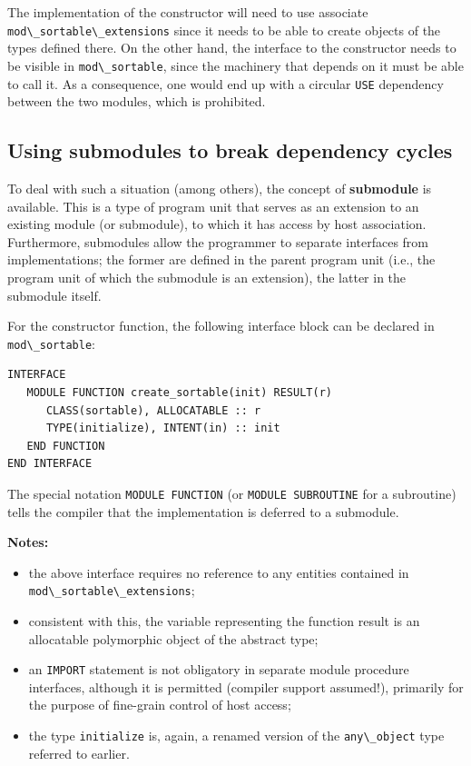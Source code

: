 \documentclass[
  paper=a4,
  ,captions=tableheading
]{scrartcl}
\newcommand{\passthrough}[1]{#1}
\providecommand{\tightlist}{%
  \setlength{\itemsep}{0pt}\setlength{\parskip}{0pt}}
\begin{document}
The implementation of the constructor will need to use associate
\passthrough{\lstinline!mod\_sortable\_extensions!} since it needs to be
able to create objects of the types defined there. On the other hand,
the interface to the constructor needs to be visible in
\passthrough{\lstinline!mod\_sortable!}, since the machinery that
depends on it must be able to call it. As a consequence, one would end
up with a circular \passthrough{\lstinline!USE!} dependency between the
two modules, which is prohibited.

\subsection{Using submodules to break dependency
cycles}\label{using-submodules-to-break-dependency-cycles}

To deal with such a situation (among others), the concept of
\textbf{submodule} is available. This is a type of program unit that
serves as an extension to an existing module (or submodule), to which it
has access by host association. Furthermore, submodules allow the
programmer to separate interfaces from implementations; the former are
defined in the parent program unit (i.e., the program unit of which the
submodule is an extension), the latter in the submodule itself.

For the constructor function, the following interface block can be
declared in \passthrough{\lstinline!mod\_sortable!}:

\begin{lstlisting}
INTERFACE
   MODULE FUNCTION create_sortable(init) RESULT(r)
      CLASS(sortable), ALLOCATABLE :: r
      TYPE(initialize), INTENT(in) :: init
   END FUNCTION
END INTERFACE
\end{lstlisting}

The special notation \passthrough{\lstinline!MODULE FUNCTION!} (or
\passthrough{\lstinline!MODULE SUBROUTINE!} for a subroutine) tells the
compiler that the implementation is deferred to a submodule.

\textbf{Notes:}

\begin{itemize}
\tightlist
\item
  the above interface requires no reference to any entities contained in
  \passthrough{\lstinline!mod\_sortable\_extensions!};
\item
  consistent with this, the variable representing the function result is
  an allocatable polymorphic object of the abstract type;
\item
  an \passthrough{\lstinline!IMPORT!} statement is not obligatory in
  separate module procedure interfaces, although it is permitted
  (compiler support assumed!), primarily for the purpose of fine-grain
  control of host access;
\item
  the type \passthrough{\lstinline!initialize!} is, again, a renamed
  version of the \passthrough{\lstinline!any\_object!} type referred to
  earlier.
\end{itemize}
\end{document}
